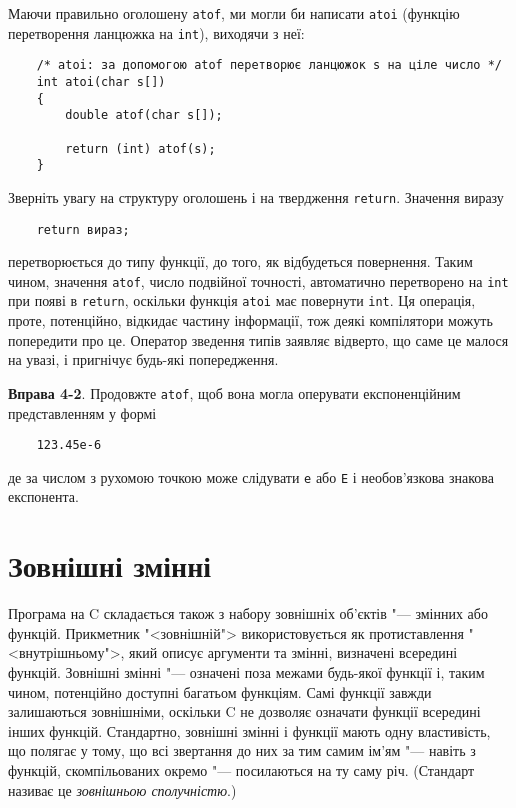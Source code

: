 \documentclass[a4paper,12pt]{book}
\begin{document}
  Маючи правильно оголошену \texttt{atof}, ми могли би написати \texttt{atoi} (функцію
  перетворення ланцюжка на \texttt{int}), виходячи з неї:
  \begin{verbatim}
    /* atoi: за допомогою atof перетворює ланцюжок s на ціле число */
    int atoi(char s[])
    {
        double atof(char s[]);

        return (int) atof(s);
    }
  \end{verbatim}

  Зверніть увагу на структуру оголошень і на твердження \texttt{return}. Значення виразу
  \begin{verbatim}
    return вираз;
  \end{verbatim}
  перетворюється до типу функції, до того, як відбудеться повернення. Таким чином,
  значення \texttt{atof}, число подвійної точності, автоматично перетворено на
  \texttt{int} при появі в \texttt{return}, оскільки функція \texttt{atoi} має повернути
  \texttt{int}. Ця операція, проте, потенційно, відкидає частину інформації, тож деякі
  компілятори можуть попередити про це. Оператор зведення типів заявляє відверто, що саме
  це малося на увазі, і пригнічує будь-які попередження.

  \textbf{Вправа 4-2}. Продовжте \texttt{atof}, щоб вона могла оперувати експоненційним
  представленням у формі
  \begin{verbatim}
    123.45e-6
  \end{verbatim}
  де за числом з рухомою точкою може слідувати \texttt{e} або \texttt{E} і необов'язкова
  знакова експонента.

\section{Зовнішні змінні}

\label{f0:ch4.3}
  Програма на C складається також з набору зовнішніх об'єктів "--- змінних або функцій.
  Прикметник "<зовнішній"> використовується як протиставлення
  "<внутрішньому">, який описує аргументи та змінні, визначені всередині
  функцій. Зовнішні змінні "--- означені поза межами будь-якої функції і, таким чином,
  потенційно доступні багатьом функціям. Самі функції завжди залишаються зовнішніми,
  оскільки C не дозволяє означати функції всередині інших функцій. Стандартно, зовнішні
  змінні і функції мають одну властивість, що полягає у тому, що всі звертання до них за
  тим самим ім'ям "--- навіть з функцій, скомпільованих окремо "--- посилаються на ту
  саму річ. (Стандарт називає це \textit{зовнішньою сполучністю}.)
\end{document}
